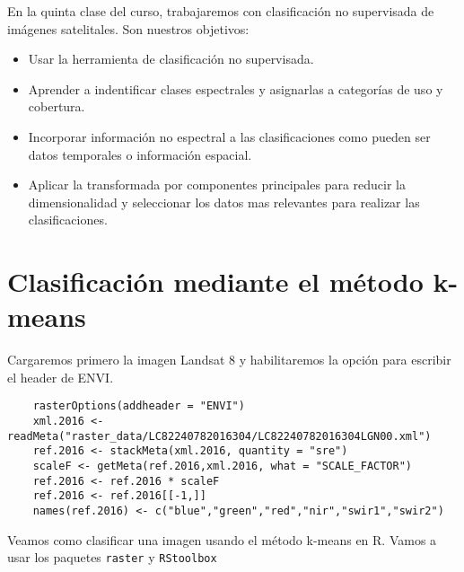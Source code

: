 En la quinta clase del curso, trabajaremos con clasificaci\'on no supervisada
de im\'agenes satelitales. Son nuestros objetivos:

\begin{itemize}
  \item Usar la herramienta de clasificaci\'on no supervisada.
  \item Aprender a indentificar clases espectrales y asignarlas a categor\'ias de uso y cobertura.
  \item Incorporar informaci\'on no espectral a las clasificaciones como
  pueden ser datos temporales o informaci\'on espacial.
  \item Aplicar la transformada por componentes principales para reducir la dimensionalidad y seleccionar los datos mas relevantes para realizar las clasificaciones.
\end{itemize}

\section{Clasificaci\'on mediante el m\'etodo k-means}

Cargaremos primero la imagen Landsat 8 y habilitaremos la opci\'on para escribir
el header de ENVI\@.

\begin{lstlisting}
    rasterOptions(addheader = "ENVI")
    xml.2016 <- readMeta("raster_data/LC82240782016304/LC82240782016304LGN00.xml")
    ref.2016 <- stackMeta(xml.2016, quantity = "sre")
    scaleF <- getMeta(ref.2016,xml.2016, what = "SCALE_FACTOR")
    ref.2016 <- ref.2016 * scaleF
    ref.2016 <- ref.2016[[-1,]]
    names(ref.2016) <- c("blue","green","red","nir","swir1","swir2")
\end{lstlisting}

Veamos como clasificar una imagen usando el m\'etodo k-means en R. Vamos a usar
los paquetes \texttt{raster} y \texttt{RStoolbox}

